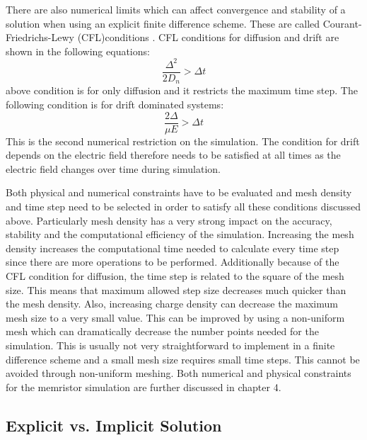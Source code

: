 \begin{doublespace}
There are also numerical limits which can affect convergence and stability of a solution when using an explicit finite difference scheme. These are called Courant-Friedrichs-Lewy (CFL)conditions \cite{NumModel}. CFL conditions for diffusion and drift are shown in the following equations:
\begin{equation}
\frac{\Delta ^2}{2 D_n}>\Delta t
\label{CFL_Diff}
\end{equation}
 above condition is for only diffusion and it restricts the maximum time step. The following condition is for drift dominated systems:
\begin{equation}
\frac{2 \Delta }{\mu E}>\Delta t
\label{CFL_Drift}
\end{equation}
This is the second numerical restriction on the simulation. The condition for drift depends on the electric field therefore  needs to be satisfied at all times as the electric field changes over time during simulation.

Both physical and numerical constraints have to be evaluated and mesh density and  time step need to be selected in order to satisfy all these conditions discussed above. Particularly mesh density has a very strong impact on the accuracy, stability and the computational efficiency of the simulation. Increasing the mesh density increases the computational time needed to calculate every time step since there are more operations to be performed. Additionally because of the CFL condition for diffusion, the time step is related to the square of the mesh size. This means that maximum allowed step size decreases much quicker than the mesh density. Also, increasing charge density can decrease the maximum mesh size to a very small value. This can be improved by using a non-uniform mesh which can dramatically decrease the number points needed for the simulation. This is usually not very straightforward to implement in a finite difference scheme and a small mesh size requires small time steps. This cannot be avoided through non-uniform meshing. Both numerical and physical constraints for the memristor simulation are further discussed in chapter 4.

\subsection{Explicit vs. Implicit Solution}


\end{doublespace}
